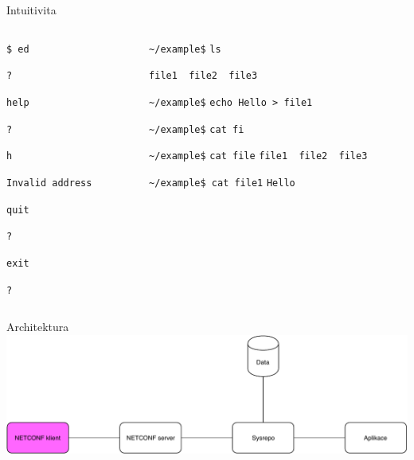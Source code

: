 \documentclass[czech,aspectratio=169]{beamer}
\begin{document}
\begin{frame}[fragile]{Intuitivita}
    \begin{columns}
        \pause{}
        \begin{column}{.47\textwidth}
            \verb|$ ed|

            \pause{}
            \verb||

            \verb|?|

            \pause{}
            \verb|help|

            \pause{}
            \verb|?|

            \pause{}
            \verb|h|

            \pause{}
            \verb|Invalid address|

            \pause{}
            \verb|quit|

            \verb|?|

            \pause{}
            \verb|exit|

            \verb|?|
            \pause{}
        \end{column}
        \begin{column}{.47\textwidth}
            \verb|~/example$|\pause{} \verb|ls|

            \pause{}
            \verb|file1  file2  file3|

            \verb|~/example$|\pause{} \verb|echo Hello > file1|

            \verb|~/example$|\pause{} \verb|cat fi| \pause{}

            \verb|~/example$| \verb|cat file|
            \pause{}
            \verb|file1  file2  file3|

            \verb|~/example$ cat file|\pause{}\verb|1|
            \pause{}
            \verb|Hello|
        \end{column}
    \end{columns}
\end{frame}

\begin{frame}{Architektura}
    \includegraphics[width=.9\textwidth]{overview}
\end{frame}
\end{document}
